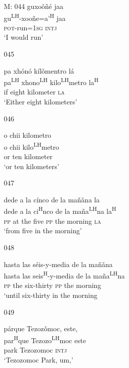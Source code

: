 \begin{itemize}
\item[M: 044]
\glll   guxo\v{o}\~{n}\'{e} jaa\\
gu\textsuperscript{LH}-xoo\~{n}e=a'\textsuperscript{H} jaa\\
\textsc{pot}-run=\textsc{1sg} \textsc{intj}\\
\glt `I would run'
 

\item[045]
 
\glll  pa xh\'{o}n\'{o} k\'{i}l\v{o}mentro l\'{a}\\
pa\textsuperscript{LH} xhono\textsuperscript{LH} kilo\textsuperscript{LH}metro la\textsuperscript{H}\\
if eight kilometer \textsc{la}\\
\glt `Either eight kilometers'
 

\item[046]
 
\glll   o chii kilometro\\
o chii kilo\textsuperscript{LH}metro\\
or ten kilometer\\
\glt `or ten kilometers'
 

\item[047]
 
\glll   dede a la c\'{i}nco de la ma\~{n}\v{an}a la\\
dede a la ci\textsuperscript{H}nco de la ma\~{n}a\textsuperscript{LH}na la\textsuperscript{H}\\
\textsc{pp} at the five \textsc{pp} the morning \textsc{la}\\
\glt `from five in the morning'
 

\item[048]
 
\glll  hasta las s\'{e}is-y-media de la ma\~{n}\v{a}na\\
hasta las seis\textsuperscript{H}-y-media de la ma\~{n}a\textsuperscript{LH}na\\
\textsc{pp} the six-thirty \textsc{pp} the morning\\
\glt `until six-thirty in the morning
 


\item[049]
 
\glll   p\'{a}rque Tezoz\v{o}moc, este,\\
par\textsuperscript{H}que Tezozo\textsuperscript{LH}moc este\\
park Tezozomoc \textsc{intj}\\
\glt `Tezozomoc Park, um,' 
 



\end{itemize}
